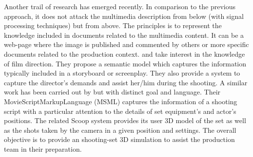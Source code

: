 Another trail of research has emerged recently. 
In comparison to the previous approach, it does not attack the multimedia description from below (with signal processing techniques) but from above. 
The principles is to represent the knowledge included in documents related to the multimedia content. 
It can be a web-page where the image is published and commented by others \cite{Simperl2009} or more specific documents related to the production context. 
\cite{Chakravarthy2009b} and \cite{Chakravarthy2009c} take interest in the knowledge of film direction. 
They propose a semantic model which captures the information typically included in a storyboard or screenplay. 
They also provide a system to capture the director's demands and assist her/him during the shooting. 
A similar work has been carried out by \cite{VanRijsselbergen2009} but with distinct goal and language. 
Their MovieScriptMarkupLanguage (MSML) captures the information of a shooting script with a particular attention to the details of set equipment's and actor's positions. 
The related Scoop system \cite{Cardinaels2008} provides its user 3D model of the set as well as the shots taken by the camera in a given position and settings. 
The overall objective is to provide an shooting-set 3D simulation to assist the production team in their preparation.\\







